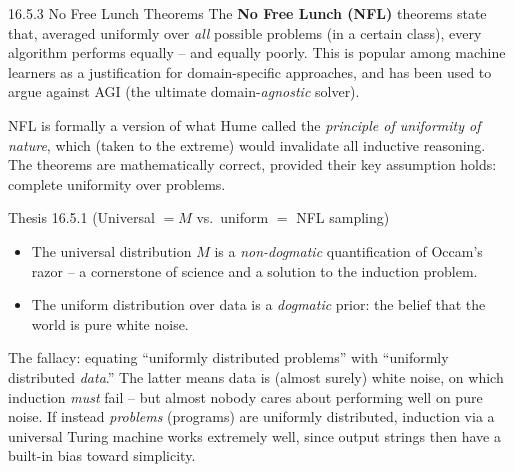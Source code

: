 \documentclass[aspectratio=169,10pt]{beamer}
\begin{document}
\begin{frame}{16.5.3 No Free Lunch Theorems}
  The \textbf{No Free Lunch (NFL)} theorems state that, averaged uniformly
  over \emph{all} possible problems (in a certain class), every algorithm
  performs equally -- and equally poorly. This is popular among machine
  learners as a justification for domain-specific approaches, and has been
  used to argue against AGI (the ultimate domain-\emph{agnostic} solver).

  \vspace{0.2em}
  NFL is formally a version of what Hume called the \emph{principle of
  uniformity of nature}, which (taken to the extreme) would invalidate all
  inductive reasoning. The theorems are mathematically correct, provided
  their key assumption holds: complete uniformity over problems.

  \begin{block}{Thesis 16.5.1 (Universal $= M$ vs.\ uniform $=$ NFL sampling)}
    \begin{itemize}
      \item The universal distribution $M$ is a \emph{non-dogmatic}
        quantification of Occam's razor -- a cornerstone of science and a
        solution to the induction problem.
      \item The uniform distribution over data is a \emph{dogmatic} prior:
        the belief that the world is pure white noise.
    \end{itemize}
  \end{block}

  \vspace{0.2em}
  \small
  The fallacy: equating ``uniformly distributed problems'' with
  ``uniformly distributed \emph{data}.'' The latter means data is (almost
  surely) white noise, on which induction \emph{must} fail -- but almost
  nobody cares about performing well on pure noise. If instead
  \emph{problems} (programs) are uniformly distributed, induction via a
  universal Turing machine works extremely well, since output strings then
  have a built-in bias toward simplicity.
\end{frame}
\end{document}

